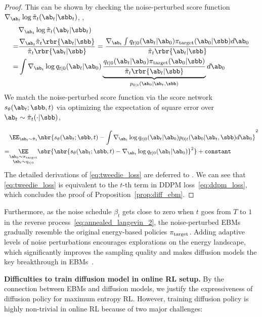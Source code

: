 \begin{proof}
    This can be shown by checking the noise-perturbed score function $\nabla_{\ab_t}\log\tilde\pi_t(\ab_t|\sbb_t)$, \ie,
    \begin{align}
        & \nabla_{\ab_t}\log\tilde\pi_t(\ab_t|\sbb_t)\label{eq:prop1_derivation}
        \\
            = & \frac{\nabla_{\ab_t}\tilde\pi_t\rbr{\ab_t|\sbb}}{\tilde\pi_t\rbr{\ab_t|\sbb}}           =  \frac{\nabla_{\ab_t}\int q_{t|0}(\ab_t|\ab_0)\pi_{\rm target}(\ab_0|\sbb)d\ab_0}{\tilde\pi_t\rbr{\ab_t|\sbb}}\notag\\
            = & \int \nabla_{\ab_t}\log q_{t|0}(\ab_t|\ab_0)\underbrace{\frac{q_{t|0}(\ab_t|\ab_0)\pi_{\rm target}(\ab_0|\sbb)}{\tilde\pi_t\rbr{\ab_t|\sbb}}}_{p_{0|t}(\ab_0|\ab_t, \sbb)}d\ab_0 \nonumber
    \end{align}
                        We match the noise-perturbed score function via the score network $s_\theta(\ab_t;\sbb, t)$ via optimizing the expectation of square error over $\ab_t\sim \tilde\pi_t(\cdot|\sbb)$,
    
    {\small
    \begin{align}
       &\EE_{\ab_t\sim\tilde\pi_t}\nbr{s_\theta(\ab_t;\sbb, t) - \int\nabla_{\ab_t}\log q_{t|0}(\ab_t|\ab_0)p_{0|t}(\ab_0|\ab_t,\sbb)d\ab_0}^2\notag\\         =&\underset{\substack{\ab_0\sim\pi_{\rm target}\\\ab_t\sim q_{t|0}}}{\EE}\sbr{\nbr{s_\theta(\ab_t;\sbb, t) -\nabla_{\ab_t}\log q_{t|0}(\ab_t|\ab_0)}^2} + \texttt{constant}\label{eq:tweedie_loss}
    \end{align}
    }
    The detailed derivations of \eqref{eq:tweedie_loss} are deferred to .
    We can see that \eqref{eq:tweedie_loss} is equivalent to the $t$-th term in DDPM loss~\eqref{eq:ddpm_loss},
    which concludes the proof of Proposition~\ref{prop:diff_ebm}.
\end{proof}


Furthermore, as the noise schedule $\beta_t$ gets close to zero when $t$ goes from $T$ to $1$ in the reverse process~\eqref{eq:annealed_langevin_2}, the noise-perturbed EBMs gradually resemble the original energy-based policies $\pi_{\rm target}$. 
Adding adaptive levels of noise perturbations encourages explorations on the energy landscape, which significantly improves the sampling quality and makes diffusion models the key breakthrough in   EBMs~\cite{song2019generative}. 

\textbf{Difficulties to train diffusion model in online RL setup.}
By the connection between EBMs and diffusion models, we justify the expressiveness of diffusion policy for maximum entropy RL. 
However, training diffusion policy is highly non-trivial in online RL because of two major challenges:

